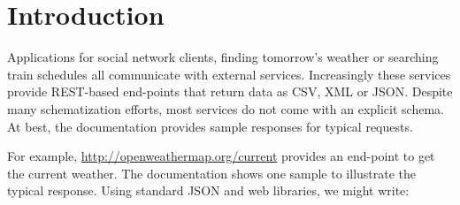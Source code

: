 \documentclass[10pt,preprint,blind,clearpagebib]{sigplanconf}
\begin{document}
%
%

\section{Introduction}
\label{sec:introduction}

Applications for social network clients, finding tomorrow's weather or searching train schedules
all communicate with external services. Increasingly these services provide REST-based 
end-points that return data as CSV, XML or JSON. Despite many schematization efforts, most 
services do not come with an explicit schema. At best, the documentation provides sample responses 
for typical requests.

For example, \url{http://openweathermap.org/current} provides an end-point to get the current weather.
The documentation shows one sample to illustrate the typical response. Using 
standard JSON and web libraries, we might write:
\end{document}
